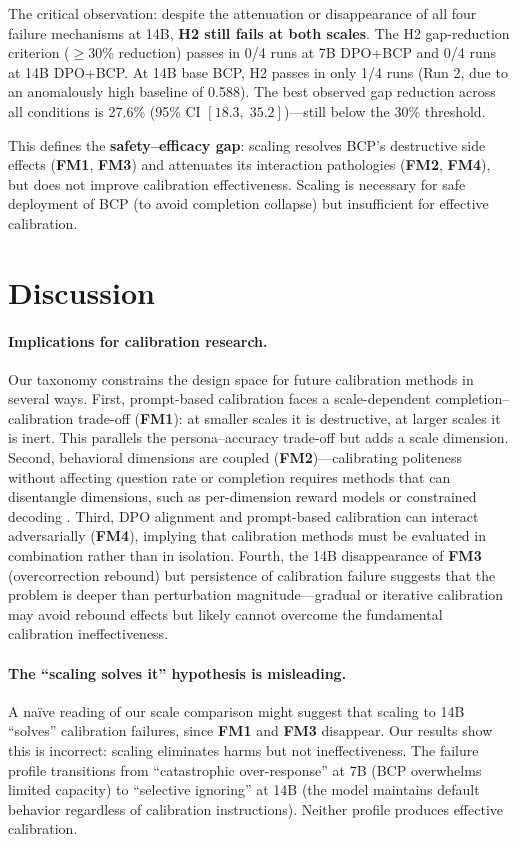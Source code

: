 \documentclass[11pt,a4paper]{article}
\newcommand{\fm}[1]{\textbf{FM#1}}
\newcommand{\ci}[2]{[#1,\;#2]}
\begin{document}
The critical observation: despite the attenuation or disappearance of all four failure mechanisms at 14B, \textbf{H2 still fails at both scales}.
The H2 gap-reduction criterion ($\geq$30\% reduction) passes in 0/4 runs at 7B DPO+BCP and 0/4 runs at 14B DPO+BCP.
At 14B base BCP, H2 passes in only 1/4 runs (Run 2, due to an anomalously high baseline of 0.588).
The best observed gap reduction across all conditions is 27.6\% (95\% CI $\ci{18.3}{35.2}$)---still below the 30\% threshold.

This defines the \textbf{safety--efficacy gap}: scaling resolves BCP's destructive side effects (\fm{1}, \fm{3}) and attenuates its interaction pathologies (\fm{2}, \fm{4}), but does not improve calibration effectiveness.
Scaling is necessary for safe deployment of BCP (to avoid completion collapse) but insufficient for effective calibration.

\section{Discussion}
\label{sec:discussion}

\paragraph{Implications for calibration research.}
Our taxonomy constrains the design space for future calibration methods in several ways.
First, prompt-based calibration faces a scale-dependent completion--calibration trade-off (\fm{1}): at smaller scales it is destructive, at larger scales it is inert.
This parallels the persona--accuracy trade-off \citep{basil2025playing_pretend, hu2026expert_persona} but adds a scale dimension.
Second, behavioral dimensions are coupled (\fm{2})---calibrating politeness without affecting question rate or completion requires methods that can disentangle dimensions, such as per-dimension reward models or constrained decoding \citep{khan2026decoding}.
Third, DPO alignment and prompt-based calibration can interact adversarially (\fm{4}), implying that calibration methods must be evaluated in combination rather than in isolation.
Fourth, the 14B disappearance of \fm{3} (overcorrection rebound) but persistence of calibration failure suggests that the problem is deeper than perturbation magnitude---gradual or iterative calibration may avoid rebound effects but likely cannot overcome the fundamental calibration ineffectiveness.

\paragraph{The ``scaling solves it'' hypothesis is misleading.}
A na\"ive reading of our scale comparison might suggest that scaling to 14B ``solves'' calibration failures, since \fm{1} and \fm{3} disappear.
Our results show this is incorrect: scaling eliminates harms but not ineffectiveness.
The failure profile transitions from ``catastrophic over-response'' at 7B (BCP overwhelms limited capacity) to ``selective ignoring'' at 14B (the model maintains default behavior regardless of calibration instructions).
Neither profile produces effective calibration.
\end{document}
